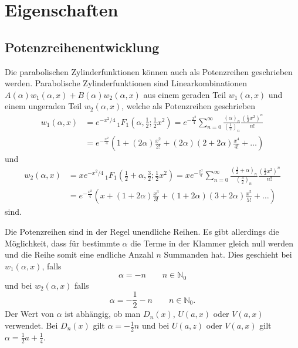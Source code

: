 %
%
%
\section{Eigenschaften
	\label{parzyl:section:Eigenschaften}}

\subsection{Potenzreihenentwicklung
	\label{parzyl:potenz}}
Die parabolischen Zylinderfunktionen können auch als Potenzreihen geschrieben werden.
Parabolische Zylinderfunktionen sind Linearkombinationen 
$A(\alpha)w_1(\alpha, x) + B(\alpha)w_2(\alpha, x)$ aus einem geraden Teil $w_1(\alpha, x)$ 
und einem ungeraden Teil $w_2(\alpha, x)$, welche als Potenzreihen geschrieben
\begin{align}
	w_1(\alpha,x)
	&=  
	e^{-x^2/4} \,
	{}_{1} F_{1}
	(
	\alpha, {\textstyle \frac{1}{2}} ; {\textstyle \frac{1}{2}}x^2) 
	= 
	e^{-\frac{x^2}{4}}
	\sum^{\infty}_{n=0}
	\frac{\left ( \alpha \right )_{n}}{\left ( \frac{1}{2}\right )_{n}}
	\frac{\left ( \frac{1}{2} x^2\right )^n}{n!} \\
	&=
	e^{-\frac{x^2}{4}}
	\left ( 
	1 
	+
	\left ( 2\alpha \right )\frac{x^2}{2!}
	+
	\left ( 2\alpha \right )\left ( 2 + 2\alpha \right )\frac{x^4}{4!}  
	+
	\dots
	\right )
\end{align}
und
\begin{align}
	w_2(\alpha,x)
	&=  
	xe^{-x^2/4} \,
	{}_{1} F_{1}
	(
	{\textstyle \frac{1}{2}} 
	+ \alpha, {\textstyle \frac{3}{2}} ; {\textstyle \frac{1}{2}}x^2) 
	= 
	xe^{-\frac{x^2}{4}}
	\sum^{\infty}_{n=0}
	\frac{\left ( \frac{1}{2} + \alpha \right )_{n}}{\left ( \frac{3}{2}\right )_{n}}
	\frac{\left ( \frac{1}{2} x^2\right )^n}{n!} \\
	&=
	e^{-\frac{x^2}{4}}
	\left ( 
	x 
	+
	\left ( 1 + 2\alpha \right )\frac{x^3}{3!}
	+
	\left ( 1 + 2\alpha \right )\left ( 3 + 2\alpha \right )\frac{x^5}{5!}  
	+
	\dots
	\right )
\end{align}
sind.


Die Potenzreihen sind in der Regel unendliche Reihen. 
Es gibt allerdings die Möglichkeit, dass für bestimmte $\alpha$ die Terme in der Klammer gleich null werden 
und die Reihe somit eine endliche Anzahl $n$ Summanden hat.
Dies geschieht bei $w_1(\alpha,x)$, falls
\begin{equation}
	\alpha =  -n \qquad n \in \mathbb{N}_0
\end{equation}
und bei $w_2(\alpha,x)$ falls
\begin{equation}
	\alpha = -\frac{1}{2} - n \qquad n \in \mathbb{N}_0.
\end{equation}
Der Wert von $\alpha$ ist abhängig, ob man $D_n(x)$, $U(a,x)$ oder $V(a,x)$ verwendet.
Bei $D_n(x)$ gilt $\alpha = -{\textstyle \frac{1}{2}} n$ und bei $U(a,z)$ oder $V(a,x)$ gilt 
$\alpha = {\textstyle \frac{1}{2}} a + {\textstyle \frac{1}{4}}$.
